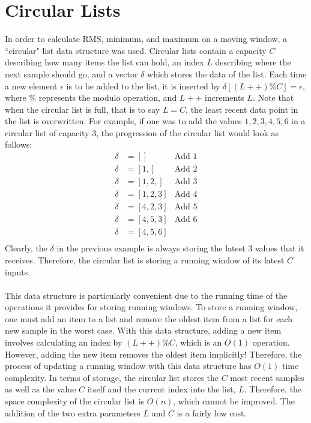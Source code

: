 \documentclass[12pt]{report}
\begin{document}
\newpage
\begin{appendix}\label{appendices}
	\chapter{Circular Lists}\label{circularlists}
	In order to calculate RMS, minimum, and maximum on a moving window, a ``circular" list data
	structure was used. Circular lists contain a capacity $C$ describing how many items the list can
	hold, an index $L$ describing where the next sample should go, and a vector $\delta$ which
	stores the data of the list. Each time a new
	element $\epsilon$ is to be added to the list, it is inserted by $\delta[(L++)\%C] = \epsilon$,
	where $\%$ represents the modulo operation, and $L++$ increments $L$. Note that when the
	circular list is full, that is to say $L = C$, the least recent data point in the list is
	overwritten. For example, if one was to add the values $1,2,3,4,5,6$ in a circular list of
	capacity 3, the progression of the circular list would look as follows:
	\begin{equation*}
		\begin{aligned}
			\delta &= [] & \mbox{Add 1}\\
			\delta &= [1,] & \mbox{Add 2}\\
			\delta &= [1,2,] & \mbox{Add 3}\\
			\delta &= [1,2,3] & \mbox{Add 4}\\
			\delta &= [4,2,3] & \mbox{Add 5}\\
			\delta &= [4,5,3] & \mbox{Add 6}\\
			\delta &= [4,5,6]\\
		\end{aligned}
	\end{equation*}
	Clearly, the $\delta$ in the previous example is always storing the latest 3 values that it
	receives. Therefore, the circular list is storing a running window of its latest $C$ inputs.\\\\
	This data structure is particularly convenient due to the running time of the operations it
	provides for storing running windows. To store a running window, one must add an item to a list
	and remove the oldest item from a list for each new sample in the worst case. With this data
	structure, adding a new item involves calculating an index by $(L++)\%C$, which is an $O(1)$
	operation. However, adding the new item removes the oldest item implicitly! Therefore, the
	process of updating a running window with this data structure has $O(1)$ time complexity. In
	terms of storage, the circular list stores the $C$ most recent samples as well as the value $C$
	itself and the current index into the list, $L$. Therefore, the space complexity of the circular
	list is $O(n)$, which cannot be improved. The addition of the two extra parameters $L$ and $C$
	is a fairly low cost.\\


\end{appendix}
\end{document}
